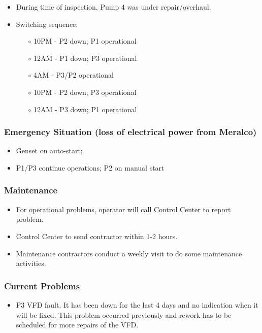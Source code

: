 \begin{itemize}
	\item During time of inspection, Pump 4 was under repair/overhaul. %
	\item Switching sequence:
	\begin{itemize}
		\item [$\circ$]	10PM - P2 down; P1 operational
		\item [$\circ$]	12AM - P1 down; P3 operational
		\item [$\circ$] 4AM - P3/P2 operational
		\item [$\circ$] 10PM - P2 down; P3 operational
		\item [$\circ$] 12AM - P3 down; P1 operational
	\end{itemize}
\end{itemize}

\subsubsection{Emergency Situation (loss of electrical power from Meralco)}
\begin{itemize}
	\item Genset on auto-start;
	\item P1/P3 continue operations; P2 on manual start

\end{itemize}

\subsubsection{Maintenance}
\begin{itemize}
	\item For operational problems, operator will call Control Center to report problem.  
	\item Control Center to send contractor within 1-2 hours.
	\item Maintenance contractors conduct a weekly visit to do some maintenance activities.
\end{itemize}

\subsubsection{Current Problems}
\begin{itemize}
	\item P3 VFD fault.  It has been down for the last 4 days and no indication when it will be fixed.  This problem occurred previously and rework has to be scheduled for more repairs of the VFD.
\end{itemize}

